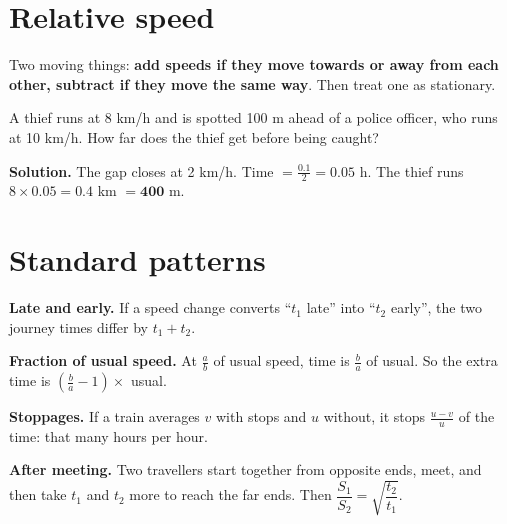 \documentclass[11pt,a4paper,openany]{report}
\begin{document}
\section{Relative speed}
Two moving things: \textbf{add speeds if they move towards or away from each other, subtract if they move the same way}. Then treat one as stationary.
\begin{center}
\end{center}

\begin{example}
A thief runs at 8 km/h and is spotted 100 m ahead of a police officer, who runs at 10 km/h. How far does the thief get before being caught?

\textbf{Solution.} The gap closes at 2 km/h. Time $=\frac{0.1}2=0.05$ h. The thief runs $8\times0.05=0.4$ km $=\mathbf{400}$ m.
\end{example}

\section{Standard patterns}
\textbf{Late and early.} If a speed change converts ``$t_1$ late'' into ``$t_2$ early'', the two journey times differ by $t_1+t_2$.

\textbf{Fraction of usual speed.} At $\frac ab$ of usual speed, time is $\frac ba$ of usual. So the extra time is $\left(\frac ba-1\right)\times$ usual.

\textbf{Stoppages.} If a train averages $v$ with stops and $u$ without, it stops $\frac{u-v}{u}$ of the time: that many hours per hour.

\textbf{After meeting.} Two travellers start together from opposite ends, meet, and then take $t_1$ and $t_2$ more to reach the far ends. Then $\dfrac{S_1}{S_2}=\sqrt{\dfrac{t_2}{t_1}}$.
\end{document}
